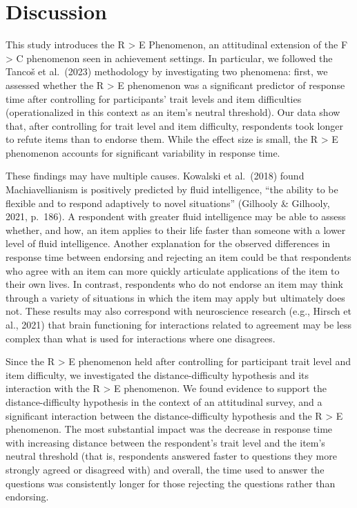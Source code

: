 \documentclass[
]{agujournal2019}
\begin{document}
\section{Discussion}\label{discussion}

This study introduces the R \textgreater{} E Phenomenon, an attitudinal
extension of the F \textgreater{} C phenomenon seen in achievement
settings. In particular, we followed the Tancoš et al.~(2023)
methodology by investigating two phenomena: first, we assessed whether
the R \textgreater{} E phenomenon was a significant predictor of
response time after controlling for participants' trait levels and item
difficulties (operationalized in this context as an item's neutral
threshold). Our data show that, after controlling for trait level and
item difficulty, respondents took longer to refute items than to endorse
them. While the effect size is small, the R \textgreater{} E phenomenon
accounts for significant variability in response time.

These findings may have multiple causes. Kowalski et al.~(2018) found
Machiavellianism is positively predicted by fluid intelligence, ``the
ability to be flexible and to respond adaptively to novel situations''
(Gilhooly \& Gilhooly, 2021, p.~186). A respondent with greater fluid
intelligence may be able to assess whether, and how, an item applies to
their life faster than someone with a lower level of fluid intelligence.
Another explanation for the observed differences in response time
between endorsing and rejecting an item could be that respondents who
agree with an item can more quickly articulate applications of the item
to their own lives. In contrast, respondents who do not endorse an item
may think through a variety of situations in which the item may apply
but ultimately does not. These results may also correspond with
neuroscience research (e.g., Hirsch et al., 2021) that brain functioning
for interactions related to agreement may be less complex than what is
used for interactions where one disagrees.

Since the R \textgreater{} E phenomenon held after controlling for
participant trait level and item difficulty, we investigated the
distance-difficulty hypothesis and its interaction with the R
\textgreater{} E phenomenon. We found evidence to support the
distance-difficulty hypothesis in the context of an attitudinal survey,
and a significant interaction between the distance-difficulty hypothesis
and the R \textgreater{} E phenomenon. The most substantial impact was
the decrease in response time with increasing distance between the
respondent's trait level and the item's neutral threshold (that is,
respondents answered faster to questions they more strongly agreed or
disagreed with) and overall, the time used to answer the questions was
consistently longer for those rejecting the questions rather than
endorsing.
\end{document}
